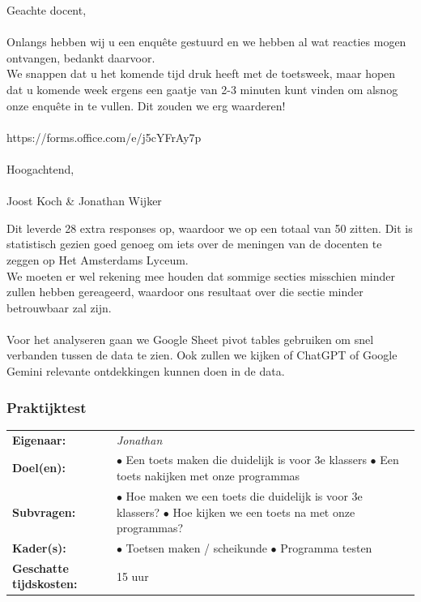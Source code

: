 \documentclass[12pt]{article}
\begin{document}
\begin{multicols}{2}
{\begin{minipage}{\linewidth}
Geachte docent,\\
\\
Onlangs hebben wij u een enquête gestuurd en we hebben al wat reacties mogen ontvangen, bedankt daarvoor.\\
We snappen dat u het komende tijd druk heeft met de toetsweek, maar hopen dat u komende week ergens een gaatje van 2-3 minuten kunt vinden om alsnog onze enquête in te vullen. Dit zouden we erg waarderen!\\
 \\
https://forms.office.com/e/j5cYFrAy7p\\
\\
Hoogachtend,\\
 \\
Joost Koch \& Jonathan Wijker
\end{minipage}}
Dit leverde 28 extra responses op, waardoor we op een totaal van 50 zitten. Dit is statistisch gezien goed genoeg om iets over de meningen van de docenten te zeggen op Het Amsterdams Lyceum. \\
We moeten er wel rekening mee houden dat sommige secties misschien minder zullen hebben gereageerd, waardoor ons resultaat over die sectie minder betrouwbaar zal zijn.\\
\\
Voor het analyseren gaan we Google Sheet pivot tables gebruiken om snel verbanden tussen de data te zien. Ook zullen we kijken of ChatGPT of Google Gemini relevante ontdekkingen kunnen doen in de data. 


\end{multicols}
\pagebreak

\subsubsection{Praktijktest}
\begin{tabularx}{0.5\linewidth}{ll}
    \textbf{Eigenaar: } & \textit{Jonathan} \\
    \textbf{Doel(en): } & 
        \makecell[tl]{
            $\bullet$ Een toets maken die duidelijk is voor 3e klassers\\
            $\bullet$ Een toets nakijken met onze programmas\\
        } \\
    \textbf{Subvragen: } & 
        \makecell[tl]{
            $\bullet$ Hoe maken we een toets die duidelijk is voor 3e klassers? \\
            $\bullet$ Hoe kijken we een toets na met onze programmas? \\
        }\\
    \textbf{Kader(s): } & 
        \makecell[tl]{
            $\bullet$ Toetsen maken / scheikunde \\
            $\bullet$ Programma testen \\
        }\\
    \parbox[t]{3cm}{\raggedright\textbf{Geschatte  tijdskosten:} } & 15 uur \\
\end{tabularx}
\pagebreak
\end{document}
